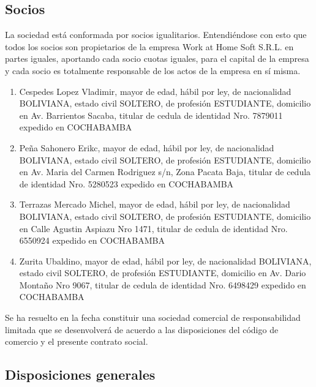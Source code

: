 \documentclass[11pt,letterpaper]{report}
\begin{document}
\subsection{ Socios } 
La sociedad est\'a conformada por socios igualitarios. Entendi\'endose con esto que todos los socios
son propietarios de la empresa Work at Home Soft S.R.L. en partes iguales, aportando cada socio
cuotas iguales, para el capital de la empresa y cada socio es totalmente responsable de los actos de
la empresa en s\'i misma.\\
\begin{enumerate}
\item Cespedes Lopez Vladimir, mayor de edad, h\'abil por ley, de nacionalidad BOLIVIANA, estado civil SOLTERO, de profesi\'on ESTUDIANTE, domicilio en Av. Barrientos Sacaba, titular de cedula de identidad Nro. 7879011 expedido en COCHABAMBA
\item Pe\~na Sahonero Erikc, mayor de edad, h\'abil por ley, de nacionalidad BOLIVIANA, estado civil SOLTERO, de profesi\'on ESTUDIANTE, domicilio en  Av. Maria del Carmen Rodriguez s/n, Zona Pacata Baja, titular de cedula de identidad Nro. 5280523 expedido en COCHABAMBA
\item Terrazas Mercado Michel, mayor de edad, h\'abil por ley, de nacionalidad BOLIVIANA, estado civil SOLTERO, de profesi\'on ESTUDIANTE, domicilio en Calle Agustin Aspiazu Nro 1471, titular de cedula de identidad Nro. 6550924 expedido en COCHABAMBA
\item Zurita Ubaldino, mayor de edad, h\'abil por ley, de nacionalidad BOLIVIANA, estado civil SOLTERO, de profesi\'on ESTUDIANTE, domicilio en Av. Dario Monta\~no Nro 9067, titular de cedula de identidad Nro. 6498429 expedido en COCHABAMBA
\end{enumerate}
Se ha resuelto en la fecha constituir una sociedad comercial de responsabilidad limitada que se desenvolver\'a de acuerdo a las disposiciones del c\'odigo de comercio y el presente contrato social.

\subsection{ Disposiciones generales }
\end{document}
